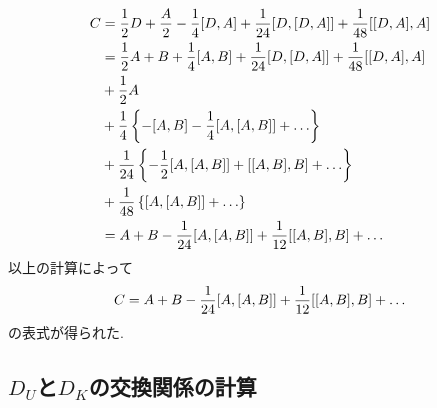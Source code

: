 \begin{align}
  C &=
       \frac{1}{2}D  + \frac{A}{2}
    -  \frac{1}{4}[D, A]
    +  \frac{1}{24}[D, [D, A]]
    +  \frac{1}{48}[[D, A], A]
    \notag \\
    &=
       \frac{1}{2}A + B
    +  \frac{1}{4}[A, B]
    +  \frac{1}{24}[D, [D, A]]
    +  \frac{1}{48}[[D, A], A]
    \notag \\
    &+ \frac{1}{2}A
    \notag \\
    &+ \frac{1}{4}
       \left\{
          - [A,B] - \frac{1}{4}[A, [A,B]] + \ldots
       \right\}
    \notag \\
    &+ \frac{1}{24}
    \left\{
      - \frac{1}{2}[A, [A,B]] + [[A,B], B] + \ldots
    \right\}
    \notag \\
    &+ \frac{1}{48}
    \left\{
      [A, [A,B]] + \ldots
    \right\}
    \notag \\
    &=
    A + B - \frac{1}{24}[A, [A,B]] + \frac{1}{12}[[A, B], B] + \dots
    \notag
\end{align}
以上の計算によって
\begin{equation}
  C
  =
  A + B - \frac{1}{24}[A, [A,B]] + \frac{1}{12}[[A, B], B] + \dots
  \notag
\end{equation}
の表式が得られた.



\subsection{$D_{U}$と$D_{K}$の交換関係の計算}

